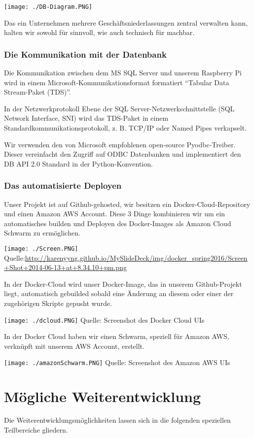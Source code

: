 \documentclass{sigchi}
\begin{document}
\texttt{[image: ./DB-Diagram.PNG]}

Das ein Unternehmen mehrere Geschäftsniederlassungen zentral verwalten kann, halten wir sowohl für sinnvoll, wie auch technisch für machbar.

\subsubsection{Die Kommunikation mit der Datenbank}
Die Kommunikation zwischen dem MS SQL Server und unserem Raspberry Pi wird in einem Microsoft-Kommunikationsformat formatiert “Tabular Data Stream-Paket (TDS)”. 

In der Netzwerkprotokoll Ebene der SQL Server-Netzwerkschnittstelle (SQL Network Interface, SNI) wird das TDS-Paket in einem Standardkommunikationsprotokoll, z. B. TCP/IP oder Named Pipes verkapselt.

Wir verwenden den von Microsoft empfohlenen open-source Pyodbc-Treiber.
Dieser vereinfacht den Zugriff auf ODBC Datenbanken und implementiert den DB API 2.0 Standard in der Python-Konvention.

\subsubsection{Das automatisierte Deployen}
Unser Projekt ist auf Github-gehosted, wir besitzen ein Docker-Cloud-Repository und einen Amazon AWS Account. Diese 3 Dinge kombinieren wir um ein automatisches builden und Deployen des Docker-Images als Amazon Cloud Schwarm zu ermöglichen.

\texttt{[image: ./Screen.PNG]}
Quelle:\url{http://karenyyng.github.io/MySlideDeck/img/docker_spring2016/Screen+Shot+2014-06-13+at+8.34.10+pm.png}

In der Docker-Cloud wird unser Docker-Image, das in unserem Github-Projekt liegt, automatisch gebuilded sobald eine Änderung an diesem oder einer der zugehörigen Skripte gepusht wurde.

\texttt{[image: ./dcloud.PNG]}
Quelle: Screenshot des Docker Cloud UIs

In der Docker Cloud haben wir einen Schwarm, speziell für Amazon AWS, verknüpft mit unserem AWS Account, erstellt.

\texttt{[image: ./amazonSchwarm.PNG]}
Quelle: Screenshot des Amazon AWS UIs

\section{Mögliche Weiterentwicklung}
Die Weiterentwicklungsmöglichkeiten lassen sich in die folgenden speziellen Teilbereiche gliedern.
\end{document}
